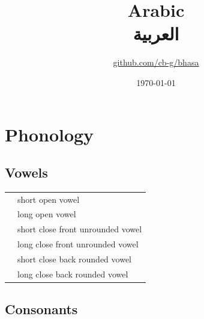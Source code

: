 \documentclass{article}
\title{Arabic\\{\arabicfont العربية}\\\ipa{[al Qara"bij:a]}}
\author{\href{https://github.com/cb-g/bhasa}{github.com/cb-g/bhasa}}
\date{\today}
\begin{document}
\pagecolor{custom_bg}\color{custom_fg}
\maketitle\thispagestyle{empty}

\newpage\setcounter{page}{1}\section{Phonology}

\subsection{Vowels}

\begin{xltabular}{\textwidth}{lL}
   & short open vowel \\
   & long open vowel \\
   & short close front unrounded vowel \\
   & long close front unrounded vowel \\
   & short close back rounded vowel \\
   & long close back rounded vowel \\
\end{xltabular}

\subsection{Consonants}
\end{document}
